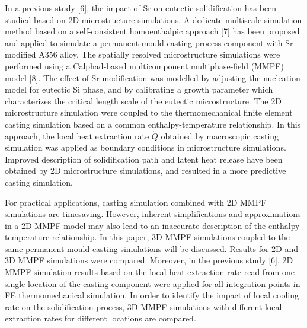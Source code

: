 \documentclass[10pt]{article}
\begin{document}
In a previous study [6], the impact of Sr on eutectic solidification has been studied based on 2D microstructure simulations. A dedicate multiscale simulation method based on a self-consistent homoenthalpic approach [7] has been proposed and applied to simulate a permanent mould casting process component with Sr-modified A356 alloy. The spatially resolved microstructure simulations were performed using a Calphad-based multicomponent multiphase-field (MMPF) model [8]. The effect of Sr-modification was modelled by adjusting the nucleation model for eutectic Si phase, and by calibrating a growth parameter which characterizes the critical length scale of the eutectic microstructure. The 2D microstructure simulation were coupled to the thermomechanical finite element casting simulation based on a common enthalpy-temperature relationship. In this approach, the local heat extraction rate $\dot{Q}$ obtained by macroscopic casting simulation was applied as boundary conditions in microstructure simulations. Improved description of solidification path and latent heat release have been obtained by 2D microstructure simulations, and resulted in a more predictive casting simulation.

For practical applications, casting simulation combined with 2D MMPF simulations are timesaving. However, inherent simplifications and approximations in a 2D MMPF model may also lead to an inaccurate description of the enthalpy-temperature relationship. In this paper, 3D MMPF simulations coupled to the same permanent mould casting simulations will be discussed. Results for 2D and 3D MMPF simulations were compared. Moreover, in the previous study [6], 2D MMPF simulation results based on the local heat extraction rate read from one single location of the casting component were applied for all integration points in FE thermomechanical simulation. In order to identify the impact of local cooling rate on the solidification process, 3D MMPF simulations with different local extraction rates for different locations are compared.
\end{document}

